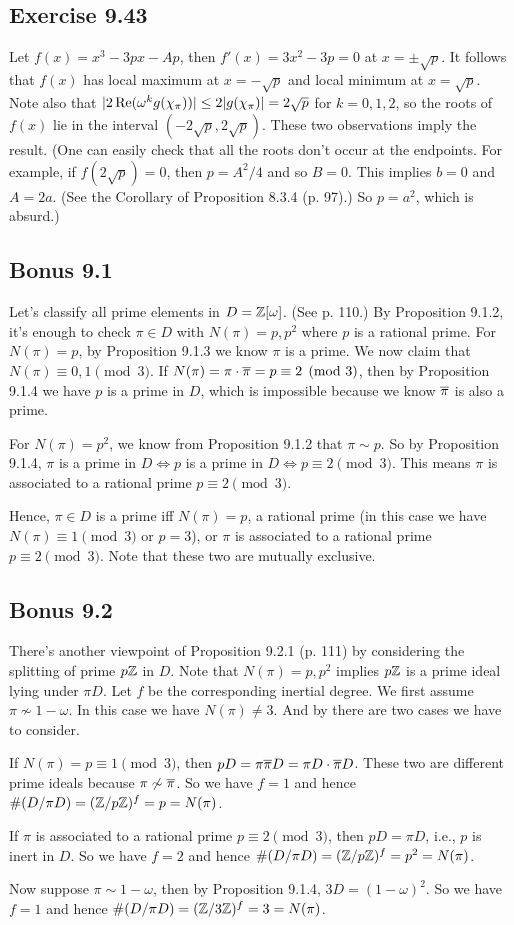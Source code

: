 \documentclass[../I&R.tex]{subfiles}
\begin{document}
\subsection*{Exercise 9.43}

Let $f(x)=x^3-3px-Ap$, then $f'(x)=3x^2-3p=0$ at $x=\pm\sqrt{p}$. It follows that $f(x)$ has local maximum at $x=-\sqrt{p}$ and local minimum at $x=\sqrt{p}$. Note also that $|2\operatorname{Re}(\omega^kg(\chi_\pi))|\leq2|g(\chi_\pi)|=2\sqrt{p}$ for $k=0,1,2$, so the roots of $f(x)$ lie in the interval $(-2\sqrt{p},2\sqrt{p})$. These two observations imply the result. (One can easily check that all the roots don't occur at the endpoints. For example, if $f(2\sqrt{p})=0$, then $p=A^2/4$ and so $B=0$. This implies $b=0$ and $A=2a$. (See the Corollary of Proposition 8.3.4 (p. 97).) So $p=a^2$, which is absurd.)

\subsection*{Bonus 9.1} \label{Bonus 9.1}

Let's classify all prime elements in $D=\mathbb{Z}[\omega]$. (See p. 110.) By Proposition 9.1.2, it's enough to check $\pi\in D$ with $N(\pi)=p,p^2$ where $p$ is a rational prime. For $N(\pi)=p$, by Proposition 9.1.3 we know $\pi$ is a prime. We now claim that $N(\pi)\equiv0,1\pmod{3}$. If $N(\pi)=\pi\cdot\overline{\pi}=p\equiv2\pmod{3}$, then by Proposition 9.1.4 we have $p$ is a prime in $D$, which is impossible because we know $\overline{\pi}$ is also a prime.

For $N(\pi)=p^2$, we know from Proposition 9.1.2 that $\pi\sim p$. So by Proposition 9.1.4, $\pi$ is a prime in $D \iff p$ is a prime in $D\iff p\equiv 2\pmod{3}$. This means $\pi$ is associated to a rational prime $p\equiv 2\pmod{3}$.

Hence, $\pi\in D$ is a prime iff $N(\pi)=p$, a rational prime (in this case we have $N(\pi)\equiv1\pmod{3}$ or $p=3$), or $\pi$ is associated to a rational prime $p\equiv 2\pmod{3}$. Note that these two are mutually exclusive.

\subsection*{Bonus 9.2}

There's another viewpoint of Proposition 9.2.1 (p. 111) by considering the splitting of prime $p\mathbb{Z}$ in $D$. Note that $N(\pi)=p,p^2$ implies $p\mathbb{Z}$ is a prime ideal lying under $\pi D$. Let $f$ be the corresponding inertial degree. We first assume $\pi\not\sim1-\omega$. In this case we have $N(\pi)\neq3$. And by  there are two cases we have to consider.

If $N(\pi)=p\equiv1\pmod{3}$, then $pD=\pi\overline{\pi}D=\pi D\cdot\overline{\pi}D$. These two are different prime ideals because $\pi\not\sim\overline{\pi}$. So we have $f=1$ and hence $\#(D/\pi D)=(\mathbb{Z}/p\mathbb{Z})^f=p=N(\pi)$.

If $\pi$ is associated to a rational prime $p\equiv 2\pmod{3}$, then $pD=\pi D$, i.e., $p$ is inert in $D$. So we have $f=2$ and hence $\#(D/\pi D)=(\mathbb{Z}/p\mathbb{Z})^f=p^2=N(\pi)$.

Now suppose $\pi\sim1-\omega$, then by Proposition 9.1.4, $3D=(1-\omega)^2$. So we have $f=1$ and hence $\#(D/\pi D)=(\mathbb{Z}/3\mathbb{Z})^f=3=N(\pi)$.
\end{document}
